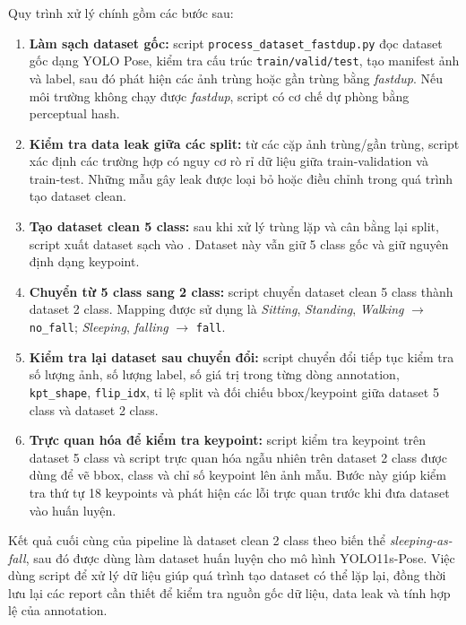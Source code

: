 \documentclass[12pt, a4paper]{article}
\begin{document}
Quy trình xử lý chính gồm các bước sau:
\begin{enumerate}[nosep]
  \item \textbf{Làm sạch dataset gốc:} script \texttt{process\_dataset\_fastdup.py} đọc dataset gốc dạng YOLO Pose, kiểm tra cấu trúc \texttt{train/valid/test}, tạo manifest ảnh và label, sau đó phát hiện các ảnh trùng hoặc gần trùng bằng \textit{fastdup}. Nếu môi trường không chạy được \textit{fastdup}, script có cơ chế dự phòng bằng perceptual hash.
  \item \textbf{Kiểm tra data leak giữa các split:} từ các cặp ảnh trùng/gần trùng, script xác định các trường hợp có nguy cơ rò rỉ dữ liệu giữa train-validation và train-test. Những mẫu gây leak được loại bỏ hoặc điều chỉnh trong quá trình tạo dataset clean.
  \item \textbf{Tạo dataset clean 5 class:} sau khi xử lý trùng lặp và cân bằng lại split, script xuất dataset sạch  vào . Dataset này vẫn giữ 5 class gốc và giữ nguyên định dạng keypoint.
  \item \textbf{Chuyển từ 5 class sang 2 class:} script  chuyển dataset clean 5 class thành dataset 2 class. Mapping được sử dụng là \textit{Sitting}, \textit{Standing}, \textit{Walking} $\rightarrow$ \texttt{no\_fall}; \textit{Sleeping}, \textit{falling} $\rightarrow$ \texttt{fall}.
  \item \textbf{Kiểm tra lại dataset sau chuyển đổi:} script chuyển đổi tiếp tục kiểm tra số lượng ảnh, số lượng label, số giá trị trong từng dòng annotation, \texttt{kpt\_shape}, \texttt{flip\_idx}, tỉ lệ split và đối chiếu bbox/keypoint giữa dataset 5 class và dataset 2 class.
  \item \textbf{Trực quan hóa để kiểm tra keypoint:} script kiểm tra keypoint trên dataset 5 class và script trực quan hóa ngẫu nhiên trên dataset 2 class được dùng để vẽ bbox, class và chỉ số keypoint lên ảnh mẫu. Bước này giúp kiểm tra thứ tự 18 keypoints và phát hiện các lỗi trực quan trước khi đưa dataset vào huấn luyện.
\end{enumerate}

Kết quả cuối cùng của pipeline là dataset clean 2 class theo biến thể \textit{sleeping-as-fall}, sau đó được dùng làm dataset huấn luyện cho mô hình YOLO11s-Pose.
Việc dùng script để xử lý dữ liệu giúp quá trình tạo dataset có thể lặp lại, đồng thời lưu lại các report cần thiết để kiểm tra nguồn gốc dữ liệu, data leak và tính hợp lệ của annotation.
\end{document}
